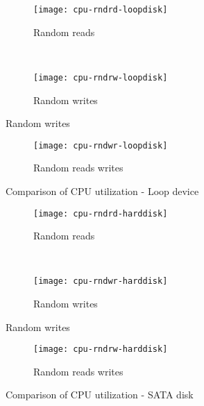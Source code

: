 \begin{figure}[!ht]
  \begin{subfigure}[b]{\textwidth}
  \texttt{[image: cpu-rndrd-loopdisk]}
  \caption{Random reads}
  \label{subfig:cpu-rndrd-loopdisk}
  \end{subfigure}\\
  \begin{subfigure}[b]{\textwidth}
  \texttt{[image: cpu-rndrw-loopdisk]}
  \caption{Random writes}
  \label{subfig:cpu-rndrw-loopdisk}
\end{subfigure}
\end{figure}

\begin{figure}[H]
  \ContinuedFloat  \begin{subfigure}[b]{\textwidth}
  \texttt{[image: cpu-rndwr-loopdisk]}
  \caption{Random reads writes}
  \label{subfig:cpu-rndwr-loopdisk}
  \end{subfigure}
\caption{Comparison of CPU utilization - Loop device}\label{fig:cpuloopdisk}
\end{figure}

\begin{figure}[!ht]
\centering
  \begin{subfigure}[b]{\textwidth}
  \texttt{[image: cpu-rndrd-harddisk]}
  \caption{Random reads}
  \label{subfig:cpu-rndrd-harddisk}
  \end{subfigure}\\
  \begin{subfigure}[b]{\textwidth}
  \texttt{[image: cpu-rndwr-harddisk]}
  \caption{Random writes}
  \label{subfig:cpu-rndwr-harddisk}
  \end{subfigure}
\end{figure}

\begin{figure}[H]
  \ContinuedFloat
  \begin{subfigure}[b]{\textwidth}
  \texttt{[image: cpu-rndrw-harddisk]}
  \caption{Random reads writes}
  \label{subfig:cpurndrw-harddisk}
  \end{subfigure}
\caption{Comparison of CPU utilization - SATA disk}\label{fig:cpuharddisk}
\end{figure}